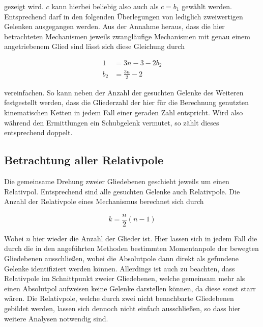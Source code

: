 gezeigt wird.
$c$ kann hierbei beliebig also auch als $c = b_1$ gewählt werden.
Entsprechend darf in den folgenden Überlegungen von lediglich zweiwertigen Gelenken ausgegangen werden.
Aus der Annahme heraus, dass die hier betrachteten Mechanismen jeweils zwangläufige Mechanismen mit genau einem angetriebenem Glied sind lässt sich diese Gleichung durch

\begin{equation}
    \begin{split}
        1 &= 3n - 3 - 2b_2 \\
        b_2 &= \frac{3n}{2} - 2
    \end{split}
\end{equation}

vereinfachen.
So kann neben der Anzahl der gesuchten Gelenke des Weiteren festgestellt werden, dass die Gliederzahl der hier für die Berechnung genutzten kinematischen Ketten in jedem Fall einer geraden Zahl entspricht.
Wird also während den Ermittlungen ein Schubgelenk vermutet, so zählt dieses entsprechend doppelt.

\subsection{Betrachtung aller Relativpole}

Die gemeinsame Drehung zweier Gliedebenen geschieht jeweils um einen Relativpol.
Entsprechend sind alle gesuchten Gelenke auch Relativpole.
Die Anzahl der Relativpole eines Mechanismus berechnet sich durch~\cite{Goessner2016}

\begin{equation}
    k = \frac{n}{2}(n-1)
    \label{eq:anzahl_pole}
\end{equation}

Wobei $n$ hier wieder die Anzahl der Glieder ist.
Hier lassen sich in jedem Fall die durch die in den angeführten Methoden bestimmten Momentanpole der bewegten Gliedebenen ausschlie{\ss}en, wobei die Absolutpole dann direkt als gefundene Gelenke identifiziert werden können.
Allerdings ist auch zu beachten, dass Relativpole im Schnittpunkt zweier Gliedebenen, welche gemeinsam mehr als einen Absolutpol aufweisen keine Gelenke darstellen können, da diese sonst starr wären.
Die Relativpole, welche durch zwei nicht benachbarte Gliedebenen gebildet werden, lassen sich dennoch nicht einfach ausschlie{\ss}en, so dass hier weitere Analysen notwendig sind.

